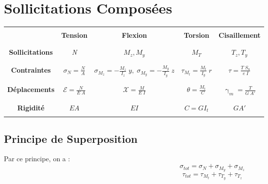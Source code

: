 \documentclass[a4paper]{article}
\begin{document}
\section{Sollicitations Composées}





\begin{center} \begin{tabular}{|c|c|c|c|c|} \hline &&&& \\
& \textbf{Tension} & \textbf{Flexion} & \textbf{Torsion} & \textbf{Cisaillement} \\ &&&& \\ \hline &&&& \\
\textbf{Sollicitations} & \emph{N} & $ M_z, M_y $ & $ M_T $ & $ T_z, T_y $ \\ &&&& \\ \hline &&&& \\
\textbf{Contraintes} & $\displaystyle \sigma_N = \frac{N}{A} $ & $\displaystyle \sigma_{M_z} = - \frac{M_z}{I_z} \; y, \; \sigma_{M_y} = - \frac{M_y}{I_y} \; z $ & $\displaystyle \tau_{M_t} = \frac{M_t}{I_g} \; r $ & $\displaystyle \tau = \frac{T \; S_n}{e \; I} $ \\ &&&& \\ \hline &&&& \\
\textbf{Déplacements} & $\displaystyle \mathcal{E} = \frac{N}{E \; A} $ & $\displaystyle \mathcal{X} = \frac{M}{E \; I} $ & $\displaystyle \theta = \frac{M_t}{C} $ & $\displaystyle \upgamma_m = \frac{T}{G \; A'} $ \\ &&&& \\ \hline &&&& \\
\textbf{Rigidité} & $ E A $ & $ E I $ & $ C = G I_t $ & $ G A' $ \\ &&&& \\ \hline
\end{tabular} \end{center}





\subsection{Principe de Superposition}





Par ce principe, on a : 
\[ \sigma_{tot} = \sigma_N + \sigma_{M_y} + \sigma_{M_z} \]
\[ \tau_{tot} = \tau_{M_t} + \tau_{T_y} + \tau_{T_z} \]
\end{document}
